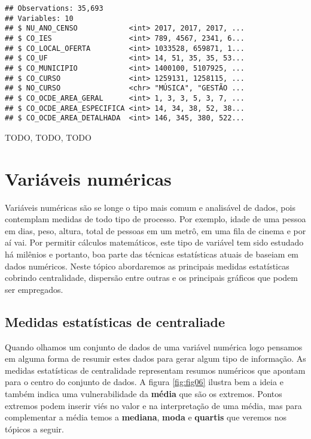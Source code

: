 \documentclass[12pt,]{style/krantz}
\theoremstyle{definition}
\theoremstyle{definition}
\theoremstyle{definition}
\theoremstyle{remark}
\let\BeginKnitrBlock\begin \let\EndKnitrBlock\end
\begin{document}
\begin{verbatim}
## Observations: 35,693
## Variables: 10
## $ NU_ANO_CENSO            <int> 2017, 2017, 2017, ...
## $ CO_IES                  <int> 789, 4567, 2341, 6...
## $ CO_LOCAL_OFERTA         <int> 1033528, 659871, 1...
## $ CO_UF                   <int> 14, 51, 35, 35, 53...
## $ CO_MUNICIPIO            <int> 1400100, 5107925, ...
## $ CO_CURSO                <int> 1259131, 1258115, ...
## $ NO_CURSO                <chr> "MÚSICA", "GESTÃO ...
## $ CO_OCDE_AREA_GERAL      <int> 1, 3, 3, 5, 3, 7, ...
## $ CO_OCDE_AREA_ESPECIFICA <int> 14, 34, 38, 52, 38...
## $ CO_OCDE_AREA_DETALHADA  <int> 146, 345, 380, 522...
\end{verbatim}

\BeginKnitrBlock{exercise}
\protect\hypertarget{exr:unnamed-chunk-37}{}{\label{exr:unnamed-chunk-37} }TODO, TODO, TODO
\EndKnitrBlock{exercise}

\hypertarget{variaveis-numericas}{%
\section{Variáveis numéricas}\label{variaveis-numericas}}

Variáveis numéricas são se longe o tipo mais comum e analisável de dados, pois contemplam medidas de todo tipo de processo. Por exemplo, idade de uma pessoa em dias, peso, altura, total de pessoas em um metrô, em uma fila de cinema e por aí vai. Por permitir cálculos matemáticos, este tipo de variável tem sido estudado há milênios e portanto, boa parte das técnicas estatísticas atuais de baseiam em dados numéricos. Neste tópico abordaremos as principais medidas estatísticas cobrindo centralidade, dispersão entre outras e os principais gráficos que podem ser empregados.

\hypertarget{medidas-estatisticas-de-centraliade}{%
\subsection{Medidas estatísticas de centraliade}\label{medidas-estatisticas-de-centraliade}}

Quando olhamos um conjunto de dados de uma variável numérica logo pensamos em alguma forma de resumir estes dados para gerar algum tipo de informação. As medidas estatísticas de centralidade representam resumos numéricos que apontam para o centro do conjunto de dados. A figura \ref{fig:fig06} ilustra bem a ideia e também indica uma vulnerabilidade da \textbf{média} que são os extremos. Pontos extremos podem inserir viés no valor e na interpretação de uma média, mas para complementar a média temos a \textbf{mediana}, \textbf{moda} e \textbf{quartis} que veremos nos tópicos a seguir.
\end{document}
